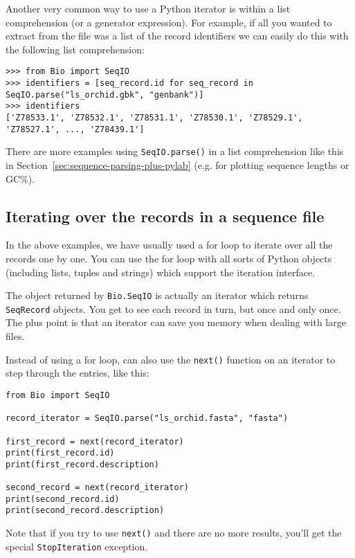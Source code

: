 Another very common way to use a Python iterator is within a list comprehension (or
a generator expression).  For example, if all you wanted to extract from the file was
a list of the record identifiers we can easily do this with the following list comprehension:

\begin{verbatim}
>>> from Bio import SeqIO
>>> identifiers = [seq_record.id for seq_record in SeqIO.parse("ls_orchid.gbk", "genbank")]
>>> identifiers
['Z78533.1', 'Z78532.1', 'Z78531.1', 'Z78530.1', 'Z78529.1', 'Z78527.1', ..., 'Z78439.1']
\end{verbatim}

\noindent There are more examples using \verb|SeqIO.parse()| in a list
comprehension like this in Section~\ref{sec:sequence-parsing-plus-pylab}
(e.g. for plotting sequence lengths or GC\%).

\subsection{Iterating over the records in a sequence file}

In the above examples, we have usually used a for loop to iterate over all the records one by one.  You can use the for loop with all sorts of Python objects (including lists, tuples and strings) which support the iteration interface.

The object returned by \verb|Bio.SeqIO| is actually an iterator which returns \verb|SeqRecord| objects.  You get to see each record in turn, but once and only once.  The plus point is that an iterator can save you memory when dealing with large files.

Instead of using a for loop, can also use the \verb|next()| function on an iterator to step through the entries, like this:

\begin{verbatim}
from Bio import SeqIO

record_iterator = SeqIO.parse("ls_orchid.fasta", "fasta")

first_record = next(record_iterator)
print(first_record.id)
print(first_record.description)

second_record = next(record_iterator)
print(second_record.id)
print(second_record.description)
\end{verbatim}

Note that if you try to use \verb|next()| and there are no more results, you'll get the special \verb|StopIteration| exception.

